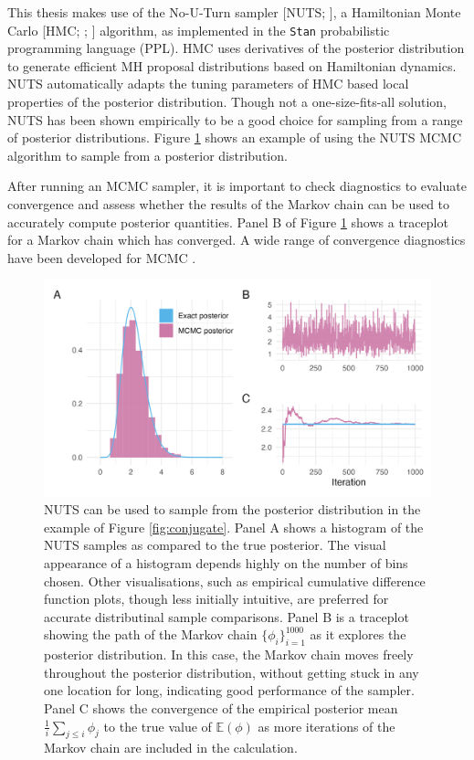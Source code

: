 \documentclass[a4paper, nobind]{templates/ociamthesis}
\begin{document}
This thesis makes use of the No-U-Turn sampler {[}NUTS; \textcite{hoffman2014no}{]}, a Hamiltonian Monte Carlo {[}HMC; \textcite{duane1987hybrid}; \textcite{neal2011mcmc}{]} algorithm, as implemented in the \texttt{Stan} \autocite{carpenter2017stan} probabilistic programming language (PPL).
HMC uses derivatives of the posterior distribution to generate efficient MH proposal distributions based on Hamiltonian dynamics.
NUTS automatically adapts the tuning parameters of HMC based local properties of the posterior distribution.
Though not a one-size-fits-all solution, NUTS has been shown empirically to be a good choice for sampling from a range of posterior distributions.
Figure \ref{fig:stan} shows an example of using the NUTS MCMC algorithm to sample from a posterior distribution.

After running an MCMC sampler, it is important to check diagnostics to evaluate convergence and assess whether the results of the Markov chain can be used to accurately compute posterior quantities.
Panel B of Figure \ref{fig:stan} shows a traceplot for a Markov chain which has converged.
A wide range of convergence diagnostics have been developed for MCMC \autocite{roy2020convergence}.



\begin{figure}
\includegraphics[width=0.95\linewidth]{figures/bayesian/stan} \caption{NUTS can be used to sample from the posterior distribution in the example of Figure \ref{fig:conjugate}. Panel A shows a histogram of the NUTS samples as compared to the true posterior. The visual appearance of a histogram depends highly on the number of bins chosen. Other visualisations, such as empirical cumulative difference function plots, though less initially intuitive, are preferred for accurate distributinal sample comparisons. Panel B is a traceplot showing the path of the Markov chain \(\{\phi_i\}_{i = 1}^{1000}\) as it explores the posterior distribution. In this case, the Markov chain moves freely throughout the posterior distribution, without getting stuck in any one location for long, indicating good performance of the sampler. Panel C shows the convergence of the empirical posterior mean \(\frac{1}{i} \sum_{j \leq i} \phi_j\) to the true value of \(\mathbb{E}(\phi)\) as more iterations of the Markov chain are included in the calculation.}\label{fig:stan}
\end{figure}
\end{document}
